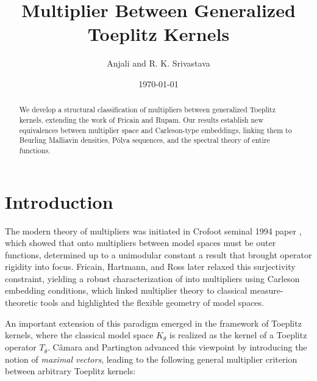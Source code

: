 \documentclass[12pt,a4paper]{amsart}
\begin{document}
\title[Multipliers]{Multiplier Between Generalized Toeplitz Kernels}

\author[Anjali and R. K. Srivastava]{Anjali and R. K. Srivastava}

\address{Department of Mathematics, Indian Institute of Technology, Guwahati, India.}





\date{\today}



\begin{abstract}
We develop a structural classification of multipliers between generalized Toeplitz kernels, extending the work of Fricain and Rupam. Our results establish new equivalences between multiplier space and Carleson-type embeddings, linking them to Beurling Malliavin densities, P\'olya
 sequences, and the spectral theory of entire functions.
\end{abstract}

\maketitle

\section{Introduction}
The modern theory of multipliers was initiated in Crofoot seminal 1994 paper \cite{Crofoot94}, which showed that onto multipliers between model spaces must be outer functions, determined up to a unimodular constant a result that brought operator rigidity into focus. Fricain, Hartmann, and Ross \cite{FHR18} later relaxed this surjectivity constraint, yielding a robust characterization of into multipliers using Carleson embedding conditions, which linked multiplier theory to classical measure-theoretic tools and highlighted the flexible geometry of model spaces.

An important extension of this paradigm emerged in the framework of Toeplitz kernels, where the classical model space $K_\theta$ is realized as the kernel of a Toeplitz operator $T_{\bar \theta}$. C{\^a}mara and Partington \cite{camara2018multipliers} advanced this viewpoint by introducing the notion of \emph{maximal vectors}, leading to the following general multiplier criterion between arbitrary Toeplitz kernels:
\end{document}
